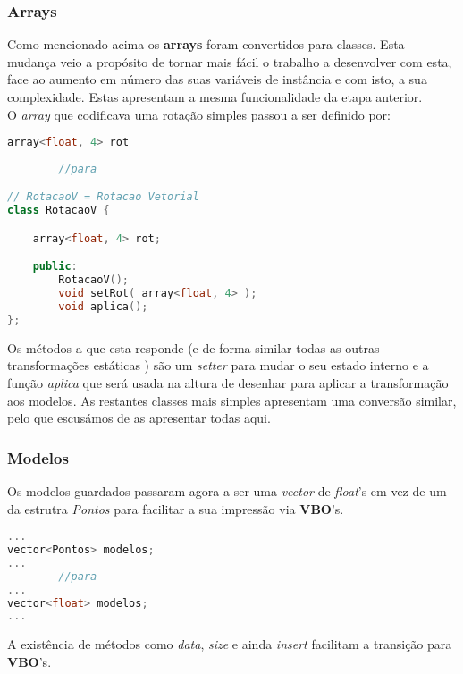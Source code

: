 \documentclass{article}
\begin{document}
\subsubsection*{Arrays}
Como mencionado acima os \textbf{arrays} foram convertidos para classes. Esta mudança veio a propósito de tornar mais fácil o trabalho a desenvolver com esta, face ao aumento em número das suas variáveis de instância e com isto, a sua complexidade. Estas apresentam a mesma funcionalidade da etapa anterior. \\
O \textit{array} que codificava uma rotação simples passou a ser definido por:
\begin{file}
        \begin{lstlisting}[language=C++]
array<float, 4> rot
		
		//para

// RotacaoV = Rotacao Vetorial
class RotacaoV {

	array<float, 4> rot;

	public:
		RotacaoV();
		void setRot( array<float, 4> );
		void aplica();
};
	\end{lstlisting}
\end{file}

Os métodos a que esta responde (e de forma similar todas as outras transformações estáticas ) são um \textit{setter} para mudar o seu estado interno e a função \textit{aplica} que será usada na altura de desenhar para aplicar a transformação aos modelos.
As restantes classes mais simples apresentam uma conversão similar, pelo que escusámos de as apresentar todas aqui.

\subsubsection*{Modelos}

Os modelos guardados passaram agora a ser uma \textit{vector} de \textit{float}'s em vez de um da estrutra \textit{Pontos} para facilitar a sua impressão via \textbf{VBO}'s.  

\begin{file}
        \begin{lstlisting}[language=C++]
...
vector<Pontos> modelos;
...		
		//para
...
vector<float> modelos;
...
	\end{lstlisting}
\end{file}

A existência de métodos como \textit{data}, \textit{size} e ainda \textit{insert} facilitam a transição para \textbf{VBO}'s.
\end{document}
